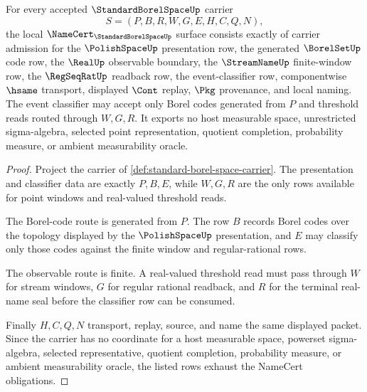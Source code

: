 \begin{theorem}
\label{thm:standard-borel-space-namecert-obligations}
For every accepted $\StandardBorelSpaceUp$ carrier
$$
S=(P,B,R,W,G,E,H,C,Q,N),
$$
the local $\NameCert_{\StandardBorelSpaceUp}$ surface consists exactly of carrier admission for the $\PolishSpaceUp$ presentation row, the generated $\BorelSetUp$ code row, the $\RealUp$ observable boundary, the $\StreamNameUp$ finite-window row, the $\RegSeqRatUp$ readback row, the event-classifier row, componentwise $\hsame$ transport, displayed $\Cont$ replay, $\Pkg$ provenance, and local naming. The event classifier may accept only Borel codes generated from $P$ and threshold reads routed through $W,G,R$. It exports no host measurable space, unrestricted sigma-algebra, selected point representation, quotient completion, probability measure, or ambient measurability oracle.
\end{theorem}
\begin{proof}
Project the carrier of \autoref{def:standard-borel-space-carrier}. The presentation and classifier data are exactly $P,B,E$, while $W,G,R$ are the only rows available for point windows and real-valued threshold reads.

The Borel-code route is generated from $P$. The row $B$ records Borel codes over the topology displayed by the $\PolishSpaceUp$ presentation, and $E$ may classify only those codes against the finite window and regular-rational rows.

The observable route is finite. A real-valued threshold read must pass through $W$ for stream windows, $G$ for regular rational readback, and $R$ for the terminal real-name seal before the classifier row can be consumed.

Finally $H,C,Q,N$ transport, replay, source, and name the same displayed packet. Since the carrier has no coordinate for a host measurable space, powerset sigma-algebra, selected representative, quotient completion, probability measure, or ambient measurability oracle, the listed rows exhaust the NameCert obligations.
\end{proof}

